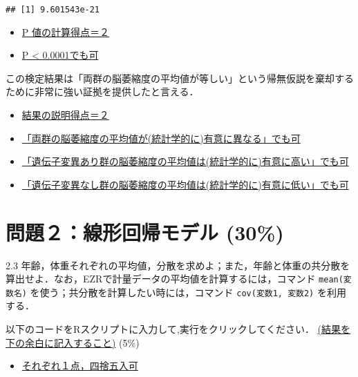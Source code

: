 \documentclass[11pt,]{problemset}
\newenvironment{Shaded}{\begin{snugshade}}{\end{snugshade}}
\newcommand{\CommentTok}[1]{\textcolor[rgb]{0.56,0.35,0.01}{\textit{#1}}}
\newcommand{\KeywordTok}[1]{\textcolor[rgb]{0.13,0.29,0.53}{\textbf{#1}}}
\newcommand{\NormalTok}[1]{#1}
\newcommand{\OperatorTok}[1]{\textcolor[rgb]{0.81,0.36,0.00}{\textbf{#1}}}
\begin{document}
\begin{verbatim}
## [1] 9.601543e-21
\end{verbatim}

\begin{itemize}
\item
  \underline{P 値の計算得点＝２}
\item
  \underline{P < 0.0001でも可}
\end{itemize}

この検定結果は「両群の脳萎縮度の平均値が等しい」という帰無仮説を棄却するために非常に強い証拠を提供したと言える．

\begin{itemize}
\item
  \underline{結果の説明得点＝２}
\item
  \underline{「両群の脳萎縮度の平均値が(統計学的に)有意に異なる」でも可}
\item
  \underline{「遺伝子変異あり群の脳萎縮度の平均値は(統計学的に)有意に高い」でも可}
\item
  \underline{「遺伝子変異なし群の脳萎縮度の平均値は(統計学的に)有意に低い」でも可}
\end{itemize}

\newpage

\hypertarget{-30}{%
\section{問題２：線形回帰モデル (30\%)}\label{-30}}

2.3
年齢，体重それぞれの平均値，分散を求めよ；また，年齢と体重の共分散を算出せよ．なお，EZRで計量データの平均値を計算するには，コマンド
\texttt{mean(変数名)} を使う；共分散を計算したい時には，コマンド
\texttt{cov(変数1,\ 変数2)} を利用する．

以下のコードをRスクリプトに入力して,実行をクリックしてください．\newline
\underline{(結果を下の余白に記入すること)} (5\%)

\begin{itemize}
\item
  \underline{それぞれ１点，四捨五入可}
\end{itemize}

\begin{Shaded}
\end{Shaded}
\end{document}
